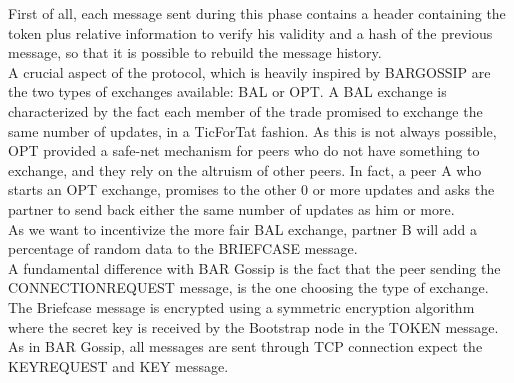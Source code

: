 \documentclass[mscthesis]{usiinfthesis}
\begin{document}
First of all, each message sent during this phase contains a header containing the token plus relative information to verify his validity and a hash of the previous message, so that it is possible to rebuild the message history. \\
A crucial aspect of the protocol, which is heavily inspired by BARGOSSIP  are the two types of exchanges available: BAL or OPT. A BAL exchange is characterized by the fact each member of the trade promised to exchange the same number of updates, in a TicForTat fashion. As this is not always possible, OPT provided a safe-net mechanism for peers who do not have something to exchange, and they rely on the altruism of other peers. In fact, a peer A who starts an OPT exchange, promises to the other 0 or more updates and asks the partner to send back either the same number of updates as him or more.  \\
As we want to incentivize the more fair BAL exchange, partner B will add a percentage of random data to the BRIEFCASE message.  \\
A fundamental difference with BAR Gossip is the fact that the peer sending the CONNECTIONREQUEST message, is the one choosing the type of exchange.  \\
The Briefcase message is encrypted using a symmetric encryption algorithm where the secret key is received by the Bootstrap node in the TOKEN message. \\
As in BAR Gossip, all messages are sent through TCP connection expect the KEYREQUEST and KEY message.

\begin{table}[H]
\centering
{}
\caption{Header description}
\label{tab:header-bar-message}
\end{table}
\end{document}
